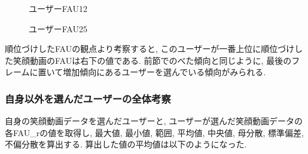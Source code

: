 \begin{figure}[htbp]
  \begin{minipage}{0.5\hsize}
    \begin{center}
    \end{center}
    \caption{ユーザーFAU12}
    \label{fig:elsefau_12}
  \end{minipage}
  \begin{minipage}{0.5\hsize}
    \begin{center}
    \end{center}
    \caption{ユーザーFAU25}
    \label{fig:elsefau_25}
  \end{minipage}
\end{figure}

順位づけしたFAUの観点より考察すると, このユーザーが一番上位に順位づけした笑顔動画のFAUは右下の値である.
前節でのべた傾向と同じように, 最後のフレームに置いて増加傾向にあるユーザーを選んでいる傾向がみられる.

\subsubsection{自身以外を選んだユーザーの全体考察}
自身の笑顔動画データを選んだユーザーと, ユーザーが選んだ笑顔動画データの各FAU\_rの値を取得し, 最大値, 最小値, 範囲, 平均値, 中央値,
母分散, 標準偏差, 不偏分散を算出する.
算出した値の平均値は以下のようになった.

